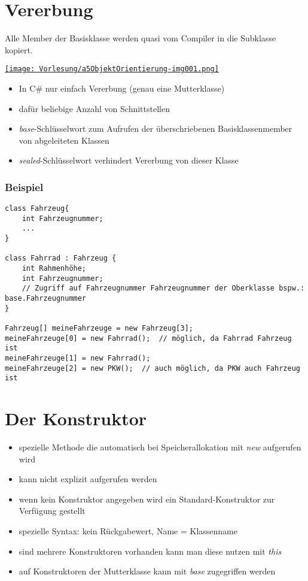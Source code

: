 \section{Vererbung}
Alle Member der Basisklasse werden quasi vom Compiler in die Subklasse kopiert.

\begin{center}
\href{https://commons.wikimedia.org/w/index.php?curid=6326887}{\texttt{[image: Vorlesung/a5ObjektOrientierung-img001.png]}}
\end{center}

\begin{itemize}
\item In C\# nur einfach Vererbung (genau eine Mutterklasse)
\item dafür beliebige Anzahl von Schnittstellen
\item \emph{base}-Schlüsselwort zum Aufrufen der überschriebenen Basisklassenmember von abgeleiteten Klassen
\item \emph{sealed}-Schlüsselwort verhindert Vererbung von dieser Klasse
\end{itemize}

\subsubsection*{Beispiel}
\begin{lstlisting}[language={[Sharp] C}]
class Fahrzeug{
	int Fahrzeugnummer;
	...
}

class Fahrrad : Fahrzeug {
	int Rahmenhöhe;
	int Fahrzeugnummer;
	// Zugriff auf Fahrzeugnummer Fahrzeugnummer der Oberklasse bspw.: base.Fahrzeugnummer
}

Fahrzeug[] meineFahrzeuge = new Fahrzeug[3];
meineFahrzeuge[0] = new Fahrrad();	// möglich, da Fahrrad Fahrzeug ist
meineFahrzeuge[1] = new Fahrrad();
meineFahrzeuge[2] = new PKW();	// auch möglich, da PKW auch Fahrzeug ist
\end{lstlisting}

\section{Der Konstruktor}

\begin{itemize}
\item spezielle Methode die automatisch bei Speicherallokation mit \emph{new} aufgerufen wird
\item kann nicht explizit aufgerufen werden
\item wenn kein Konstruktor angegeben wird ein Standard-Konstruktor zur Verfügung gestellt 
\item spezielle Syntax: kein Rückgabewert, Name = Klassenname
\end{itemize}\bigskip
\begin{itemize}
\item sind mehrere Konstruktoren vorhanden kann man diese nutzen mit \emph{this}
\item auf Konstruktoren der Mutterklasse kann mit \emph{base} zugegriffen werden
\end{itemize}

